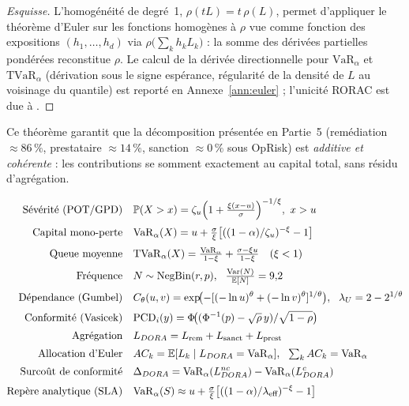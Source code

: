 \documentclass[11pt,a4paper]{article}
\theoremstyle{navystyle}
\theoremstyle{navydef}
\newcommand{\E}{\mathbb{E}}
\newcommand{\Prob}{\mathbb{P}}
\newcommand{\Var}{\mathrm{Var}}
\newcommand{\VaR}{\mathrm{VaR}}
\newcommand{\TVaR}{\mathrm{TVaR}}
\begin{document}
\begin{proof}[Esquisse]
L'homogénéité de degré~1, $\rho(tL)=t\,\rho(L)$, permet d'appliquer le théorème d'Euler sur les fonctions homogènes à $\rho$ vue comme fonction des expositions $(h_1,\dots,h_d)$ via $\rho\bigl(\sum_k h_k L_k\bigr)$ : la somme des dérivées partielles pondérées reconstitue $\rho$. Le calcul de la dérivée directionnelle pour $\VaR_\alpha$ et $\TVaR_\alpha$ (dérivation sous le signe espérance, régularité de la densité de $L$ au voisinage du quantile) est reporté en Annexe~\ref{ann:euler} ; l'unicité RORAC est due à \citet{tasche1999}.
\end{proof}

\noindent Ce théorème garantit que la décomposition présentée en Partie~5 (remédiation $\approx86\,\%$, prestataire $\approx14\,\%$, sanction $\approx0\,\%$ sous OpRisk) est \emph{additive et cohérente} : les contributions se somment exactement au capital total, sans résidu d'agrégation.

\begin{formulaire}
\small
\begin{align*}
\text{Sévérité (POT/GPD)} &\quad \Prob(X>x)=\zeta_u\Bigl(1+\tfrac{\xi(x-u)}{\sigma}\Bigr)^{-1/\xi},\ x>u \\[2pt]
\text{Capital mono-perte} &\quad \VaR_\alpha(X)=u+\tfrac{\sigma}{\xi}\bigl[((1-\alpha)/\zeta_u)^{-\xi}-1\bigr] \\[2pt]
\text{Queue moyenne} &\quad \TVaR_\alpha(X)=\tfrac{\VaR_\alpha}{1-\xi}+\tfrac{\sigma-\xi u}{1-\xi}\quad(\xi<1) \\[2pt]
\text{Fréquence} &\quad N\sim\mathrm{NegBin}(r,p),\ \ \tfrac{\Var(N)}{\E[N]}=9{,}2 \\[2pt]
\text{Dépendance (Gumbel)} &\quad C_\theta(u,v)=\exp\!\bigl(-[(-\ln u)^\theta+(-\ln v)^\theta]^{1/\theta}\bigr),\ \ \lambda_U=2-2^{1/\theta} \\[2pt]
\text{Conformité (Vasicek)} &\quad \mathrm{PCD}_i(y)=\Phi\!\bigl((\Phi^{-1}(p)-\sqrt\rho\,y)/\sqrt{1-\rho}\bigr) \\[2pt]
\text{Agrégation} &\quad L_{DORA}=L_{\text{rem}}+L_{\text{sanct}}+L_{\text{prest}} \\[2pt]
\text{Allocation d'Euler} &\quad AC_k=\E[L_k\mid L_{DORA}=\VaR_\alpha],\ \ \textstyle\sum_k AC_k=\VaR_\alpha \\[2pt]
\text{Surcoût de conformité} &\quad \Delta_{DORA}=\VaR_\alpha(L_{DORA}^{nc})-\VaR_\alpha(L_{DORA}^{c}) \\[2pt]
\text{Repère analytique (SLA)} &\quad \VaR_\alpha(S)\approx u+\tfrac{\sigma}{\xi}\bigl[((1-\alpha)/\lambda_{\text{eff}})^{-\xi}-1\bigr]
\end{align*}
\end{formulaire}
\end{document}
